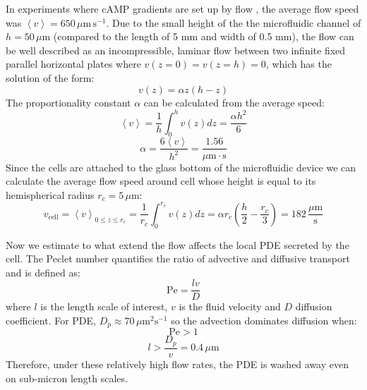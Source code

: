 \documentclass[10pt]{article}
\begin{document}
In experiments where cAMP gradients are set up by flow \cite{song, eberhard1, fuller-1}, the average flow speed was $\left\langle v\right\rangle = 650\,\mu\mathrm{m\,s^{-1}}$. Due to the small height of the the microfluidic channel of $h = 50\,\mu\mathrm{m}$ (compared to the length of 5 mm and width of 0.5 mm), the flow can be well described as an incompressible, laminar flow between two infinite fixed parallel horizontal plates where $v(z=0) = v(z=h) = 0$, which has the solution of the form:
\begin{equation}
	v(z) = \alpha z(h - z)
\end{equation}
The proportionality constant $\alpha$ can be calculated from the average speed:
\begin{equation}
	\left\langle v\right\rangle = \frac{1}{h}\int_0^h v(z) dz = \frac{\alpha h^2}{6}
\end{equation}
\begin{equation}
	\alpha = \frac{6 \left\langle v\right\rangle}{h^2} = \frac{1.56}{\mu\mathrm{m\cdot s}}
\end{equation}
Since the cells are attached to the glass bottom of the microfluidic device we can calculate the average flow speed around cell whose height is equal to its hemispherical radius $r_c = 5\,\mu\mathrm{m}$:
\begin{equation}
	v_{\mathrm{cell}} = \left\langle v\right\rangle_{0\leq z \leq r_c} = \frac{1}{r_c} \int_0^{r_c} v(z) dz = \alpha r_c \left(\frac{h}{2} - \frac{r_c}{3}\right) = 182\,\frac{\mu\mathrm{m}}{\mathrm{s}}
\end{equation}




Now we estimate to what extend the flow affects the local PDE secreted by the cell.
The Peclet number quantifies the ratio of advective and diffusive transport and is defined as:
\begin{equation}
	\mathrm{Pe} = \frac{l v}{D}
\end{equation}
where $l$ is the length scale of interest, $v$ is the fluid velocity and $D$ diffusion coefficient. For PDE, $D_p \approx 70\,\mu\mathrm{m^2s^{-1}}$ so the advection dominates diffusion when:
\begin{equation}
	\mathrm{Pe} > 1
\end{equation}
\begin{equation}
	l > \frac{D_p}{v} = 0.4\,\mu\mathrm{m}
\end{equation}
Therefore, under these relatively high flow rates, the PDE is washed away even on sub-micron length scales.
\end{document}
